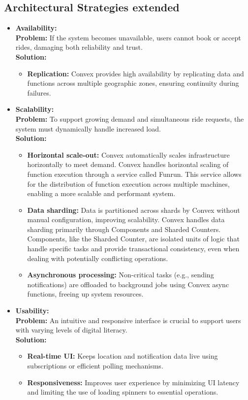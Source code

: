\documentclass[12pt]{article}
\begin{document}
\subsection{Architectural Strategies extended}
\begin{itemize}
  \item \textbf{Availability:} \\
  \textbf{Problem:} If the system becomes unavailable, users cannot book or accept rides, damaging both reliability and trust. \\
  \textbf{Solution:} 
  \begin{itemize}
    \item \textbf{Replication:} Convex provides high availability by replicating data and functions across multiple geographic zones, ensuring continuity during failures.
  \end{itemize}
  
  \item \textbf{Scalability:} \\
  \textbf{Problem:} To support growing demand and simultaneous ride requests, the system must dynamically handle increased load. \\
  \textbf{Solution:} 
  \begin{itemize}
    \item \textbf{Horizontal scale-out:} Convex automatically scales infrastructure horizontally to meet demand. Convex handles horizontal scaling of function execution through a service called Funrun. This service allows for the distribution of function execution across multiple machines, enabling a more scalable and performant system.
    \item \textbf{Data sharding:} Data is partitioned across shards by Convex without manual configuration, improving scalability. Convex handles data sharding primarily through Components and Sharded Counters. Components, like the Sharded Counter, are isolated units of logic that handle specific tasks and provide transactional consistency, even when dealing with potentially conflicting operations.
    \item \textbf{Asynchronous processing:} Non-critical tasks (e.g., sending notifications) are offloaded to background jobs using Convex async functions, freeing up system resources.
  \end{itemize}

  \item \textbf{Usability:} \\
  \textbf{Problem:} An intuitive and responsive interface is crucial to support users with varying levels of digital literacy. \\
  \textbf{Solution:} 
  \begin{itemize}
    \item \textbf{Real-time UI:} Keeps location and notification data live using subscriptions or efficient polling mechanisms.
    \item \textbf{Responsiveness:} Improves user experience by minimizing UI latency and limiting the use of loading spinners to essential operations.
  \end{itemize}


\end{itemize}
\end{document}

